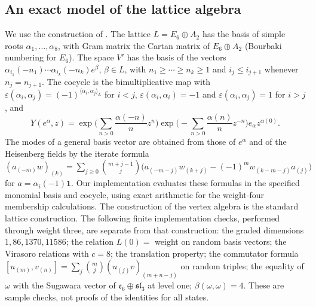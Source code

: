 \documentclass[leqno]{article}
\renewcommand{\leq}{\ensuremath{\leqslant}}
\renewcommand{\geq}{\ensuremath{\geqslant}}
\newcommand{\epsi}{\varepsilon}
\numberwithin{equation}{section}
\begin{document}
\subsection{An exact model of the lattice algebra}

We use the construction of \cite[Chapter 8]{FLM88}. The lattice $L = E_6 \oplus A_2$ has the basis of simple roots $\alpha_1,\ldots,\alpha_8$, with Gram matrix the Cartan matrix of $E_6 \oplus A_2$ (Bourbaki numbering for $E_6$). The space $V'$ has the basis of the vectors $\alpha_{i_1}(-n_1)\cdots\alpha_{i_k}(-n_k)e^\beta$, $\beta \in L$, with $n_1 \geq \cdots \geq n_k \geq 1$ and $i_j \leq i_{j+1}$ whenever $n_j = n_{j+1}$. The cocycle is the bimultiplicative map with $\epsi(\alpha_i,\alpha_j) = (-1)^{\langle\alpha_i,\alpha_j\rangle_L}$ for $i<j$, $\epsi(\alpha_i,\alpha_i) = -1$ and $\epsi(\alpha_i,\alpha_j) = 1$ for $i>j$, and
\begin{equation}
\label{eq:vertex-op}
Y(e^\alpha,z) = \exp\Big(\sum_{n>0}\frac{\alpha(-n)}{n}z^n\Big)\exp\Big(-\sum_{n>0}\frac{\alpha(n)}{n}z^{-n}\Big)e_\alpha z^{\alpha(0)}.
\end{equation}
The modes of a general basis vector are obtained from those of $e^\alpha$ and of the Heisenberg fields by the iterate formula $(a_{(-m)}w)_{(k)} = \sum_{j \geq 0}\binom{m+j-1}{j}\big(a_{(-m-j)}w_{(k+j)}-(-1)^mw_{(k-m-j)}a_{(j)}\big)$ for $a = \alpha_i(-1)\mathbf 1$. Our implementation evaluates these formulas in the specified monomial basis and cocycle, using exact arithmetic for the weight-four membership calculations. The construction of the vertex algebra is the standard lattice construction. The following finite implementation checks, performed through weight three, are separate from that construction: the graded dimensions $1, 86, 1370, 11586$; the relation $L(0) = $ weight on random basis vectors; the Virasoro relations with $c = 8$; the translation property; the commutator formula $[u_{(m)},v_{(n)}] = \sum_j\binom{m}{j}(u_{(j)}v)_{(m+n-j)}$ on random triples; the equality of $\omega$ with the Sugawara vector of $\mathfrak e_6 \oplus \mathfrak{sl}_3$ at level one; $\beta(\omega,\omega) = 4$. These are sample checks, not proofs of the identities for all states.
\end{document}
